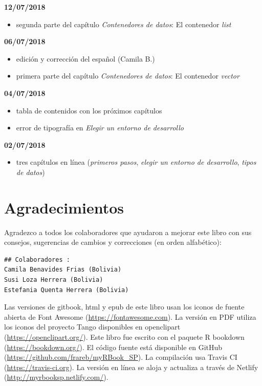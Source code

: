 \documentclass[]{book}
\providecommand{\tightlist}{%
  \setlength{\itemsep}{0pt}\setlength{\parskip}{0pt}}
\begin{document}
\textbf{12/07/2018}

\begin{itemize}
\tightlist
\item
  segunda parte del capítulo \emph{Contenedores de datos}: El contenedor
  \emph{list}
\end{itemize}

\textbf{06/07/2018}

\begin{itemize}
\tightlist
\item
  edición y corrección del español (Camila B.)
\item
  primera parte del capítulo \emph{Contenedores de datos}: El contenedor
  \emph{vector}
\end{itemize}

\textbf{04/07/2018}

\begin{itemize}
\tightlist
\item
  tabla de contenidos con los próximos capítulos
\item
  error de tipografía en \emph{Elegir un entorno de desarrollo}
\end{itemize}

\textbf{02/07/2018}

\begin{itemize}
\tightlist
\item
  tres capítulos en línea (\emph{primeros pasos}, \emph{elegir un
  entorno de desarrollo}, \emph{tipos de datos})
\end{itemize}

\chapter{Agradecimientos}\label{remerciements}

Agradezco a todos los colaboradores que ayudaron a mejorar este libro
con sus consejos, sugerencias de cambios y correcciones (en orden
alfabético):

\begin{verbatim}
## Colaboradores :
Camila Benavides Frias (Bolivia)
Susi Loza Herrera (Bolivia)
Estefania Quenta Herrera (Bolivia)
\end{verbatim}

Las versiones de gitbook, html y epub de este libro usan los iconos de
fuente abierta de Font Awesome (\url{https://fontawesome.com}). La
versión en PDF utiliza los iconos del proyecto Tango disponibles en
openclipart (\url{https://openclipart.org/}). Este libro fue escrito con
el paquete R bookdown (\url{https://bookdown.org/}). El código fuente
está disponible en GitHub (\url{https://github.com/frareb/myRBook_SP}).
La compilación usa Travis CI (\url{https://travis-ci.org}). La versión
en línea se aloja y actualiza a través de Netlify
(\url{http://myrbooksp.netlify.com/}).
\end{document}
